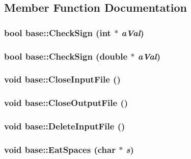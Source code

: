 \subsection{Member Function Documentation}
\hypertarget{classbase_af2babc9c4b820165f746bb531866643c}{
\subsubsection[{CheckSign}]{\setlength{\rightskip}{0pt plus 5cm}bool base::CheckSign (int $\ast$ {\em aVal})}}
\label{classbase_af2babc9c4b820165f746bb531866643c}
\hypertarget{classbase_af7d1c48d9c4d70ab66ada169492bc3bb}{
\subsubsection[{CheckSign}]{\setlength{\rightskip}{0pt plus 5cm}bool base::CheckSign (double $\ast$ {\em aVal})}}
\label{classbase_af7d1c48d9c4d70ab66ada169492bc3bb}
\hypertarget{classbase_a56480e2d42e0f66e1416dbf064a913d1}{
\subsubsection[{CloseInputFile}]{\setlength{\rightskip}{0pt plus 5cm}void base::CloseInputFile ()}}
\label{classbase_a56480e2d42e0f66e1416dbf064a913d1}
\hypertarget{classbase_ad76df71a686123678d59cceb6045e24e}{
\subsubsection[{CloseOutputFile}]{\setlength{\rightskip}{0pt plus 5cm}void base::CloseOutputFile ()}}
\label{classbase_ad76df71a686123678d59cceb6045e24e}
\hypertarget{classbase_a7ca584f6b100bb78cbaec8cfaaf9a30c}{
\subsubsection[{DeleteInputFile}]{\setlength{\rightskip}{0pt plus 5cm}void base::DeleteInputFile ()}}
\label{classbase_a7ca584f6b100bb78cbaec8cfaaf9a30c}
\hypertarget{classbase_af2a52574d11ffe404e59c3b609b9853c}{
\subsubsection[{EatSpaces}]{\setlength{\rightskip}{0pt plus 5cm}void base::EatSpaces (char $\ast$ {\em s})}}
